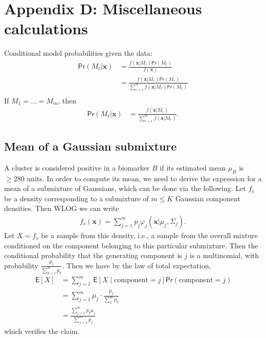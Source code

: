 \documentclass{uwstat572}
\newcommand*\ba{\[ \begin{aligned}}
\newcommand*\ea{\end{aligned} \]}
\newcommand*\E[1]{\;\mathsf{E}\left[#1\right]}
\newcommand*\bx{\mathbf{x}}
\renewcommand\;{\,}
\renewcommand\phi{\varphi}
\renewcommand\Pr[1]{ \mathsf{Pr}\left(#1\right) }
\begin{document}
\section*{Appendix D: Miscellaneous calculations}
Conditional model probabilities given the data:
\ba
\Pr{M_\ell | \bx} & = \frac{f(\bx | M_\ell) \Pr{M_\ell}}{ f(\bx) } \\
	& = \frac{f(\bx | M_\ell) \Pr{M_\ell}}{ \sum_{r = 1}^m f(\bx | M_r) \Pr{M_r} } \\
\ea
If $M_1 = \dotsc = M_m$, then
\ba
\Pr{M_\ell | \bx} & = \frac{f(\bx | M_\ell)}{ \sum_{r=1}^m f(\bx | M_r) }.
\ea

\subsection*{Mean of a Gaussian submixture}
A cluster is considered positive in a biomarker $B$ if its estimated mean $\mu_B$ is $\ge 280$ units.
In order to compute its mean, we need to derive the expression for a mean of a submixture of Gaussians, which can be done via the following.
Let $f_s$ be a density corresponding to a submixture of $m \le K$ Gaussian component densities.
Then WLOG we can write
\ba
f_s(\bx) = \sum_{j=1}^m p_j \phi_j(\bx | \mu_j, \Sigma_j).
\ea
Let $X \sim f_s$ be a sample from this density, i.e., a sample from the overall mixture conditioned on the component belonging to this particular submixture.
Then the conditional probability that the generating component is $j$ is a multinomial, with probability $\frac{p_j}{\sum_{k=1}^m p_k}$.
Then we have by the law of total expectation,
\ba
\E{X}
	& = \sum_{j=1}^m \E{X \mid \text{component} = j }
			\Pr{ \text{component} = j } \\
	& = \sum_{j=1}^m \mu_j \cdot \frac{p_j}{ \sum_k^m p_k } \\
	& = \frac{ \sum_{j=1}^m p_j \mu_j }{ \sum_{j=1}^m p_j }
\ea
which verifies the claim.
\end{document}
